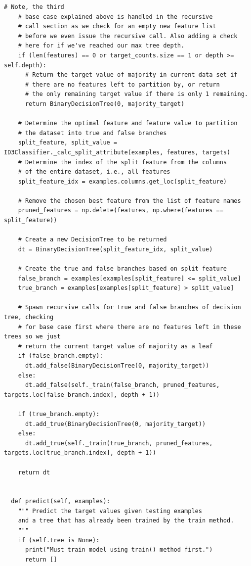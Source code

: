 \documentclass[a4paper]{article}
\begin{document}
\begin{lstlisting}[basicstyle= \scriptsize]
    # Note, the third
    # base case explained above is handled in the recursive
    # call section as we check for an empty new feature list
    # before we even issue the recursive call. Also adding a check
    # here for if we've reached our max tree depth.
    if (len(features) == 0 or target_counts.size == 1 or depth >= self.depth):
      # Return the target value of majority in current data set if
      # there are no features left to partition by, or return
      # the only remaining target value if there is only 1 remaining.
      return BinaryDecisionTree(0, majority_target)

    # Determine the optimal feature and feature value to partition
    # the dataset into true and false branches
    split_feature, split_value = ID3Classifier._calc_split_attribute(examples, features, targets) 
    # Determine the index of the split feature from the columns
    # of the entire dataset, i.e., all features
    split_feature_idx = examples.columns.get_loc(split_feature)

    # Remove the chosen best feature from the list of feature names
    pruned_features = np.delete(features, np.where(features == split_feature))

    # Create a new DecisionTree to be returned
    dt = BinaryDecisionTree(split_feature_idx, split_value)

    # Create the true and false branches based on split feature
    false_branch = examples[examples[split_feature] <= split_value]
    true_branch = examples[examples[split_feature] > split_value]

    # Spawn recursive calls for true and false branches of decision tree, checking
    # for base case first where there are no features left in these trees so we just
    # return the current target value of majority as a leaf
    if (false_branch.empty):
      dt.add_false(BinaryDecisionTree(0, majority_target))
    else:
      dt.add_false(self._train(false_branch, pruned_features, targets.loc[false_branch.index], depth + 1))

    if (true_branch.empty):
      dt.add_true(BinaryDecisionTree(0, majority_target))
    else:
      dt.add_true(self._train(true_branch, pruned_features, targets.loc[true_branch.index], depth + 1))

    return dt


  def predict(self, examples):
    """ Predict the target values given testing examples
    and a tree that has already been trained by the train method.
    """
    if (self.tree is None):
      print("Must train model using train() method first.")
      return []


\end{lstlisting}
\end{document}
